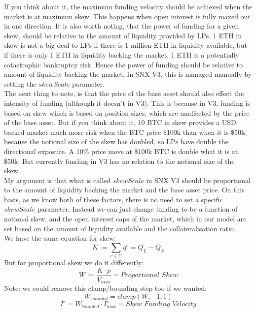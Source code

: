 \documentclass[]{article}
\begin{document}
If you think about it, the maximum funding velocity should be achieved when the market is at maximum skew. This happens when open interest is fully maxed out in one direction. It is also worth noting, that the power of funding for a given skew, should be relative to the amount of liquidity provided by LPs. 1 ETH in skew is not a big deal to LPs if there is 1 million ETH in liquidity available, but if there is only 1 ETH in liquidity backing the market, 1 ETH is a potentially catastrophic bankruptcy risk. Hence the power of funding should be relative to amount of liquidity backing the market. In SNX V3, this is managed manually by setting the $skewScale$ parameter.\\

The next thing to note, is that the price of the base asset should also effect the intensity of funding (although it doesn't in V3). This is because in V3, funding is based on skew which is based on position sizes, which are unaffected by the price of the base asset. But if you think about it, 10 BTC in skew provides a USD backed market much more risk when the BTC price \$100k than when it is \$50k, because the notional size of the skew has doubled, so LPs have double the directional exposure. A 10\% price move at \$100k BTC is double what it is at \$50k. But currently funding in V3 has no relation to the notional size of the skew.\\

My argument is that what is called $skewScale$ in SNX V3 should be proportional to the amount of liquidity backing the market and the base asset price. On this basis, as we know both of these factors, there is no need to set a specific $skewScale$ parameter. Instead we can just change funding to be a function of notional skew, and the open interest caps of the market, which in our model are set based on the amount of liquidity available and the collateralisation ratio.\\

We have the same equation for skew:
\begin{equation}
K := \sum_{c \in C}{q^c} = Q_L - Q_S
\end{equation}
But for proportional skew we do it differently:
\begin{equation}
W := \frac{K \cdot p}{V_{max}} = \textit{Proportional Skew}
\end{equation}
Note: we could remove this clamp/bounding step too if we wanted:
\begin{equation}
W_{\textit{bounded}} = clamp(W, -1, 1)
\end{equation}
\begin{equation}
I^s = W_{\textit{bounded}} \cdot I^s_{max} = \textit{Skew Funding Velocity}
\end{equation}
\end{document}
